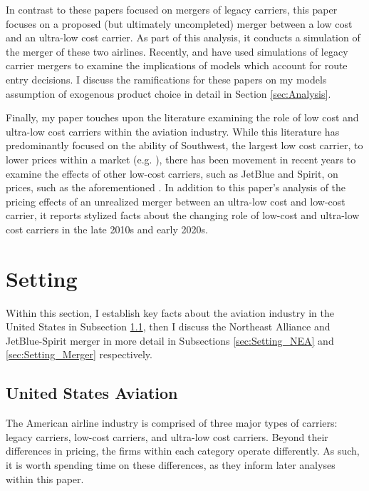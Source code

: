 \documentclass{article}
\begin{document}
    In contrast to these papers focused on mergers of legacy carriers, this paper focuses on a proposed (but ultimately uncompleted) merger between a low cost and an ultra-low cost carrier. As part of this analysis, it conducts a simulation of the merger of these two airlines. Recently, \citet{ciliberto_market_2021} and \citet{li_repositioning_2022} have used simulations of legacy carrier mergers to examine the implications of models which account for route entry decisions. I discuss the ramifications for these papers on my models assumption of exogenous product choice in detail in Section \ref{sec:Analysis}. 
	
	Finally, my paper touches upon the literature examining the role of low cost and ultra-low cost carriers within the aviation industry. While this literature has predominantly focused on the ability of Southwest, the largest low cost carrier, to lower prices within a market (e.g. \citet{windle_short_1995, morrison_actual_2001,  goolsbee_how_2008}), there has been movement in recent years to examine the effects of other low-cost carriers, such as JetBlue and Spirit, on prices, such as the aforementioned \citet{shrago_spirit_2024}. In addition to this paper's analysis of the pricing effects of an unrealized merger between an ultra-low cost and low-cost carrier, it reports stylized facts about the changing role of low-cost and ultra-low cost carriers in the late 2010s and early 2020s.  
	
	\section{Setting}
	\label{sec:Setting}
	
	Within this section, I establish key facts about the aviation industry in the United States in Subsection \ref{sec:Setting_Aviation}, then I discuss the Northeast Alliance and JetBlue-Spirit merger in more detail in Subsections \ref{sec:Setting_NEA} and \ref{sec:Setting_Merger} respectively.
	
	\subsection{United States Aviation}
	\label{sec:Setting_Aviation}
	The American airline industry is comprised of three major types of carriers: legacy carriers, low-cost carriers, and ultra-low cost carriers. Beyond their differences in pricing, the firms within each category operate differently. As such, it is worth spending time on these differences, as they inform later analyses within this paper.
	
\end{document}
